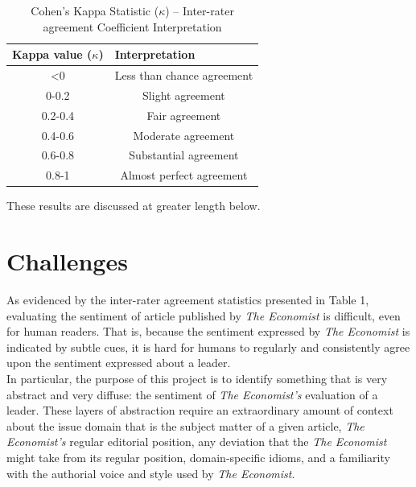 \documentclass[11pt, letterpaper, twoside]{article}
\begin{document}
        \begin{table}[ht]
                \centering
                \caption{Cohen's Kappa Statistic ($\kappa$) -- Inter-rater agreement Coefficient Interpretation}
                    \begin{tabular}{@{}cc@{}}
                        \toprule
                        \multicolumn{1}{l}{\textbf{Kappa value ($\kappa$)}} & \multicolumn{1}{l}{\textbf{Interpretation}} \\ \midrule
                        \textless{}0 & Less than chance agreement \\
                        0-0.2        & Slight agreement           \\
                        0.2-0.4      & Fair agreement             \\
                        0.4-0.6      & Moderate agreement         \\
                        0.6-0.8      & Substantial agreement      \\
                        0.8-1        & Almost perfect agreement   \\ \bottomrule
                        \end{tabular}
        \end{table}

        These results are discussed at greater length below.

\section{Challenges}
    As evidenced by the inter-rater agreement statistics presented in Table 1, evaluating the sentiment of article published by \textit{The Economist} is difficult, even for human readers. That is, because the sentiment expressed by \textit{The Economist} is indicated by subtle cues, it is hard for humans to regularly and consistently agree upon the sentiment expressed about a leader.\\

    In particular, the purpose of this project is to identify something that is very abstract and very diffuse: the sentiment of \textit{The Economist's} evaluation of a leader. These layers of abstraction require an extraordinary amount of context about the issue domain that is the subject matter of a given article, \textit{The Economist's} regular editorial position, any deviation that the \textit{The Economist} might take from its regular position, domain-specific idioms, and a familiarity with the authorial voice and style used by \textit{The Economist}.\\
\end{document}
